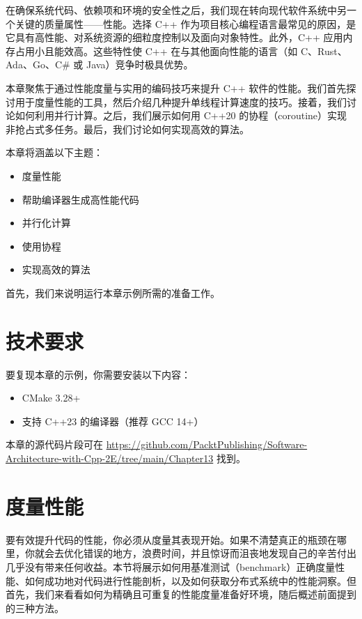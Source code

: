 在确保系统代码、依赖项和环境的安全性之后，我们现在转向现代软件系统中另一个关键的质量属性——性能。选择 C++ 作为项目核心编程语言最常见的原因，是它具有高性能、对系统资源的细粒度控制以及面向对象特性。此外，C++ 应用内存占用小且能效高。这些特性使 C++ 在与其他面向性能的语言（如 C、Rust、Ada、Go、C\# 或 Java）竞争时极具优势。

本章聚焦于通过性能度量与实用的编码技巧来提升 C++ 软件的性能。我们首先探讨用于度量性能的工具，然后介绍几种提升单线程计算速度的技巧。接着，我们讨论如何利用并行计算。之后，我们展示如何用 C++20 的协程（coroutine）实现非抢占式多任务。最后，我们讨论如何实现高效的算法。

本章将涵盖以下主题：

\begin{itemize}
\item 度量性能
\item 帮助编译器生成高性能代码
\item 并行化计算
\item 使用协程
\item 实现高效的算法
\end{itemize}

首先，我们来说明运行本章示例所需的准备工作。

\section{技术要求}

要复现本章的示例，你需要安装以下内容：

\begin{itemize}
\item CMake 3.28+
\item 支持 C++23 的编译器（推荐 GCC 14+）
\end{itemize}

本章的源代码片段可在 \href{https://github.com/PacktPublishing/Software-Architecture-with-Cpp-2E/tree/main/Chapter13}{https://github.com/PacktPublishing/Software-Architecture-with-Cpp-2E/tree/main/Chapter13} 找到。

\section{度量性能}

\label{idx:1158}
要有效提升代码的性能，你必须从度量其表现开始。如果不清楚真正的瓶颈在哪里，你就会去优化错误的地方，浪费时间，并且惊讶而沮丧地发现自己的辛苦付出几乎没有带来任何收益。本节将展示如何用基准测试（benchmark）正确度量性能、如何成功地对代码进行性能剖析，以及如何获取分布式系统中的性能洞察。但首先，我们来看看如何为精确且可重复的性能度量准备好环境，随后概述前面提到的三种方法。

